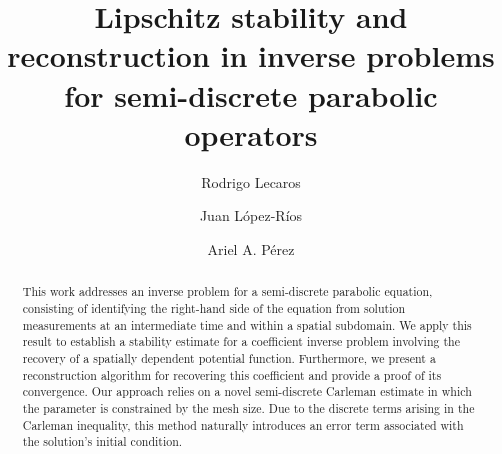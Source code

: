 \documentclass{amsart}
\numberwithin{equation}{section}
\begin{document}
\title[Lipschitz stability and reconstruction in inverse problem]{Lipschitz stability and reconstruction in inverse problems for semi-discrete parabolic operators}
\author[R. Lecaros]{Rodrigo Lecaros}
\address[R. Lecaros]{Departamento de Matem\'atica, Universidad T\'ecnica Federico Santa Mar\'ia,  Santiago, Chile.}

\author[J. L\'opez-R\'ios]{Juan L\'opez-R\'ios}
\address[J. L\'opez-R\'ios]{Universidad Industrial de Santander, Escuela de Matemáticas, A.A. 678, Bucaramanga, Colombia}

\author[A. A. P\'erez]{Ariel A. P\'erez}
\address[A. A. P\'erez]{(Corresponding Author) Departamento de Matem\'atica, Universidad del B\'io-B\'io, Concepci\'on, Chile.}



\begin{abstract}
    This work addresses an inverse problem for a semi-discrete parabolic equation, consisting of identifying the right-hand side of the equation from solution measurements at an intermediate time and within a spatial subdomain. We apply this result to establish a stability estimate for a coefficient inverse problem involving the recovery of a spatially dependent potential function. Furthermore, we present a reconstruction algorithm for recovering this coefficient and provide a proof of its convergence. Our approach relies on a novel semi-discrete Carleman estimate in which the parameter is constrained by the mesh size. Due to the discrete terms arising in the Carleman inequality, this method naturally introduces an error term associated with the solution's initial condition. 

\end{abstract}
\maketitle
\end{document}
